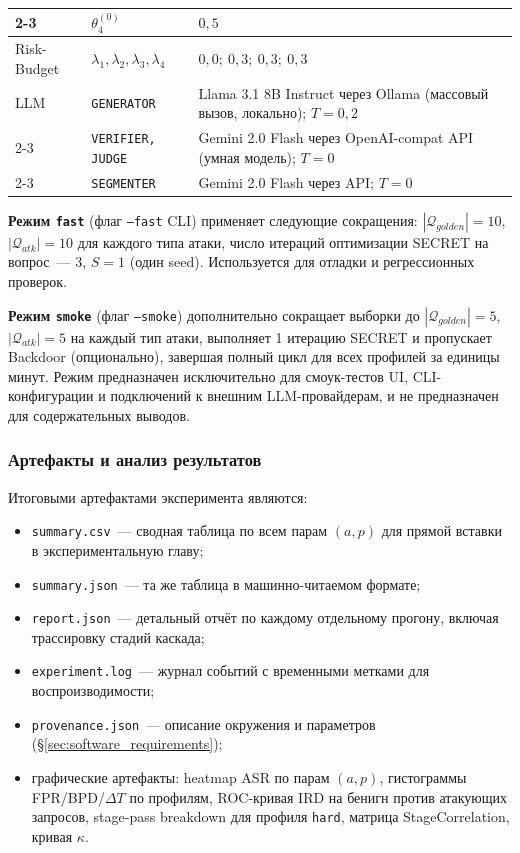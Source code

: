 \documentclass[12pt, a4paper]{article}
\theoremstyle{definition}
\theoremstyle{remark}
\begin{document}
\begin{table}[H]
\begin{tabular}{|p{}|p{}|p{}|}
\cline{2-3}
                 & $\theta_4^{(0)}$                & $0{,}5$ \\
\hline
Risk-Budget      & $\lambda_1, \lambda_2, \lambda_3, \lambda_4$ & $0{,}0;\ 0{,}3;\ 0{,}3;\ 0{,}3$ \\
\hline
LLM              & \texttt{GENERATOR}              & Llama 3.1 8B Instruct через Ollama (массовый вызов, локально); $T = 0{,}2$ \\
\cline{2-3}
                 & \texttt{VERIFIER, JUDGE} & Gemini 2.0 Flash через OpenAI-compat API (умная модель); $T = 0$ \\
\cline{2-3}
                 & \texttt{SEGMENTER}             & Gemini 2.0 Flash через API; $T = 0$ \\
\hline
\end{tabular}
\end{table}

\noindent \textbf{Режим \texttt{fast}} (флаг \texttt{--fast} CLI) применяет следующие сокращения: $|\mathcal{Q}_{golden}| = 10$, $|\mathcal{Q}_{atk}| = 10$ для каждого типа атаки, число итераций оптимизации SECRET на вопрос~--- 3, $S = 1$ (один seed). Используется для отладки и регрессионных проверок.

\textbf{Режим \texttt{smoke}} (флаг \texttt{--smoke}) дополнительно сокращает выборки до $|\mathcal{Q}_{golden}| = 5$, $|\mathcal{Q}_{atk}| = 5$ на каждый тип атаки, выполняет 1 итерацию SECRET и пропускает Backdoor (опционально), завершая полный цикл для всех профилей за единицы минут. Режим предназначен исключительно для смоук-тестов UI, CLI-конфигурации и подключений к внешним LLM-провайдерам, и не предназначен для содержательных выводов.

\subsubsection{Артефакты и анализ результатов}

Итоговыми артефактами эксперимента являются:
\begin{itemize}[label=$\bullet$]
    \item \texttt{summary.csv}~--- сводная таблица по всем парам $(a, p)$ для прямой вставки в экспериментальную главу;
    \item \texttt{summary.json}~--- та же таблица в машинно-читаемом формате;
    \item \texttt{report.json}~--- детальный отчёт по каждому отдельному прогону, включая трассировку стадий каскада;
    \item \texttt{experiment.log}~--- журнал событий с временными метками для воспроизводимости;
    \item \texttt{provenance.json}~--- описание окружения и параметров (\S\ref{sec:software_requirements});
    \item графические артефакты: heatmap ASR по парам $(a, p)$, гистограммы FPR/BPD/$\Delta T$ по профилям, ROC-кривая IRD на бенигн против атакующих запросов, stage-pass breakdown для профиля \texttt{hard}, матрица StageCorrelation, кривая $\kappa$.
\end{itemize}
\end{document}
